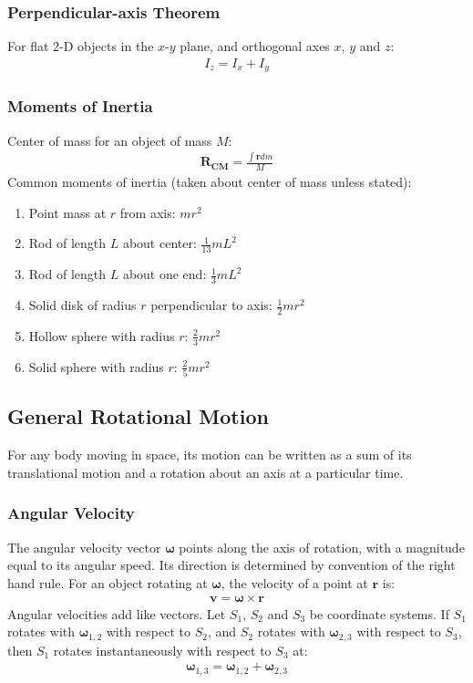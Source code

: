 \documentclass[11pt]{article}
\newcommand{\ve}[1]{
  \ensuremath{\bm{#1}}}	               %
\begin{document}
\begin{multicols*}{3}
\subsubsection{Perpendicular-axis Theorem}
For flat 2-D objects in the $x$-$y$ plane, and orthogonal axes $x$, $y$ and $z$:
\begin{align*}
I_z=I_x+I_y
\end{align*}
\subsubsection{Moments of Inertia}
Center of mass for an object of mass $M$:
\begin{align*}
\ve{R_\text{CM}}=\frac{\int\ve{r}dm}{M}
\end{align*}
Common moments of inertia (taken about center of mass unless stated):
\begin{enumerate}
\setlength{\itemsep}{2mm}
\item Point mass at $r$ from axis: $mr^2$
\item Rod of length $L$ about center: $\frac{1}{13}mL^2$
\item Rod of length $L$ about one end: $\frac{1}{3}mL^2$
\item Solid disk of radius $r$ perpendicular to axis: $\frac{1}{2}mr^2$
\item Hollow sphere with radius $r$: $\frac{2}{3}mr^2$
\item Solid sphere with radius $r$: $\frac{2}{5}mr^2$
\end{enumerate}

\subsection{General Rotational Motion}
For any body moving in space, its motion can be written as a sum of its translational motion and a rotation about an axis at a particular time. 

\subsubsection{Angular Velocity}
The angular velocity vector $\ve{\omega}$ points along the axis of rotation, with a  magnitude equal to its angular speed. Its direction is determined by convention of the right hand rule. For an object rotating at $\ve{\omega}$, the velocity of a point at $\ve{r}$ is:
\begin{align*}
\ve{v} = \ve{\omega} \times \ve{r}
\end{align*}
Angular velocities add like vectors. Let $S_1$, $S_2$ and $S_3$ be coordinate systems. If $S_1$ rotates with $\ve{\omega}_{1, 2}$ with respect to $S_2$, and $S_2$ rotates with $\ve{\omega}_{2, 3}$ with respect to $S_3$, then $S_1$ rotates instantaneously with respect to $S_3$ at: 
\begin{align*}
\ve{\omega}_{1, 3} = \ve{\omega}_{1, 2} + \ve{\omega}_{2, 3}
\end{align*}


\end{multicols*}
\end{document}
